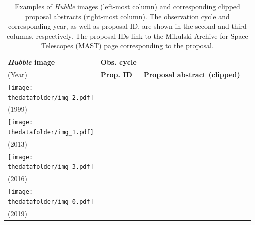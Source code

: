 \documentclass[10pt]{article} %
\newcommand{\hubble}{\emph{Hubble}\xspace}
\begin{document}
\begin{table}[h!]
  \centering
  \begin{tabular}{m{} p{1.9cm} p{1.9cm} m{7.5cm}}
      \toprule
      \centering \bfseries \hubble image & \centering \bfseries Obs. cycle \\ (Year) & \centering \bfseries Prop. ID & \centering \bfseries Proposal abstract (clipped) \tabularnewline
      \midrule
      \centering \texttt{[image: \\thedatafolder/img\_2.pdf]} & \centering  \\ (1999) & \centering  &  {\scriptsize } \tabularnewline
      \midrule
      \centering \texttt{[image: \\thedatafolder/img\_1.pdf]} & \centering  \\ (2013) & \centering  &  {\scriptsize } \tabularnewline
      \midrule
      \centering \texttt{[image: \\thedatafolder/img\_3.pdf]} & \centering  \\ (2016) & \centering  &  {\scriptsize } \tabularnewline
      \midrule
      \centering \texttt{[image: \\thedatafolder/img\_0.pdf]} & \centering  \\ (2019) & \centering  &  {\scriptsize } \tabularnewline
      \bottomrule
  \end{tabular}
  \caption{Examples of \hubble images (left-most column) and corresponding clipped proposal abstracts (right-most column). The observation cycle and corresponding year, as well as proposal ID, are shown in the second and third columns, respectively. The proposal IDs link to the Mikulski Archive for Space Telescopes (MAST) page corresponding to the proposal.}
  \label{tab:dataset}
\end{table}
\end{document}
